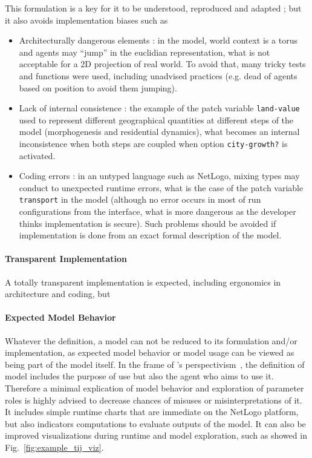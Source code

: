 This formulation is a key for it to be understood, reproduced and adapted ; but it also avoids implementation biases such as
\begin{itemize}
\item Architecturally dangerous elements : in the model, world context is a torus and agents may ``jump'' in the euclidian representation, what is not acceptable for a 2D projection of real world. To avoid that, many tricky tests and functions were used, including unadvised practices (e.g. dead of agents based on position to avoid them jumping).
\item Lack of internal consistence : the example of the patch variable \texttt{land-value} used to represent different geographical quantities at different steps of the model (morphogenesis and residential dynamics), what becomes an internal inconsistence when both steps are coupled when option \texttt{city-growth?} is activated.
\item Coding errors : in an untyped language such as NetLogo, mixing types may conduct to unexpected runtime errors, what is the case of the patch variable \texttt{transport} in the model (although no error occurs in most of run configurations from the interface, what is more dangerous as the developer thinks implementation is secure). Such problems should be avoided if implementation is done from an exact formal description of the model.
\end{itemize}


\paragraph{Transparent Implementation}

A totally transparent implementation is expected, including ergonomics in architecture and coding, but 

\paragraph{Expected Model Behavior}

Whatever the definition, a model can not be reduced to its formulation and/or implementation, as expected model behavior or model usage can be viewed as being part of the model itself. In the frame of 's perspectivism~\cite{giere2010scientific}, the definition of model includes the purpose of use but also the agent who aims to use it. Therefore a minimal explication of model behavior and exploration of parameter roles is highly advised to decrease chances of misuses or misinterpretations of it. It includes simple runtime charts that are immediate on the NetLogo platform, but also indicators computations to evaluate outputs of the model. It can also be improved visualizations during runtime and model exploration, such as showed in Fig.~\ref{fig:example_tij_viz}.

